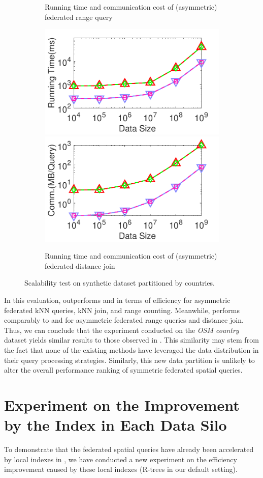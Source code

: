 \begin{figure}[t]
\begin{subfigure}{0.48\textwidth}
        \caption{Running time and communication cost of (asymmetric) federated range query}
        \label{fig:range-eff-size-n-cty}
    \end{subfigure}      
     \begin{subfigure}{0.48\textwidth}
        \centering
        \includegraphics[width=0.48\linewidth]{apdx/dj_datasize_time_revision.pdf}
        \includegraphics[width=0.48\linewidth]{apdx/dj_datasize_cost_revision.pdf}
        \caption{Running time and communication cost of (asymmetric) federated distance join}
    \end{subfigure}   
    \caption{Scalability test on synthetic dataset partitioned by countries.}
    \label{fig:exp-cty}
\end{figure}

In this evaluation, \sysname outperforms \smcqlext and \conclaveext in terms of efficiency for asymmetric federated kNN queries, kNN join, and range counting. 
Meanwhile, \sysname performs comparably to \smcqlext and \conclaveext for asymmetric federated range queries and distance join.
Thus, we can conclude that the experiment conducted on the \textit{OSM country} dataset yields similar results to those observed in . This similarity may stem from the fact that none of the existing methods have leveraged the data distribution in their query processing strategies.
Similarly, this new data partition is unlikely to alter the overall performance ranking of symmetric federated spatial queries. 

\section{Experiment on the Improvement by the Index in Each Data Silo}
\label{appendix:spatial-index}
To demonstrate that the federated spatial queries have already been accelerated by local indexes in \sysname, we have conducted a new experiment on the efficiency improvement caused by these local indexes (\ie R-trees in our default setting).


